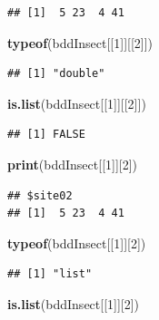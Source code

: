\documentclass[twoside,symmetric]{book}
\newenvironment{Shaded}{}{}
\newcommand{\DecValTok}[1]{#1}
\newcommand{\KeywordTok}[1]{\textbf{#1}}
\newcommand{\NormalTok}[1]{#1}
\begin{document}
\begin{verbatim}
## [1]  5 23  4 41
\end{verbatim}

\begin{Shaded}
\begin{Highlighting}[]
\KeywordTok{typeof}\NormalTok{(bddInsect[[}\DecValTok{1}\NormalTok{]][[}\DecValTok{2}\NormalTok{]])}
\end{Highlighting}
\end{Shaded}

\begin{verbatim}
## [1] "double"
\end{verbatim}

\begin{Shaded}
\begin{Highlighting}[]
\KeywordTok{is.list}\NormalTok{(bddInsect[[}\DecValTok{1}\NormalTok{]][[}\DecValTok{2}\NormalTok{]])}
\end{Highlighting}
\end{Shaded}

\begin{verbatim}
## [1] FALSE
\end{verbatim}

\begin{Shaded}
\begin{Highlighting}[]
\KeywordTok{print}\NormalTok{(bddInsect[[}\DecValTok{1}\NormalTok{]][}\DecValTok{2}\NormalTok{])}
\end{Highlighting}
\end{Shaded}

\begin{verbatim}
## $site02
## [1]  5 23  4 41
\end{verbatim}

\begin{Shaded}
\begin{Highlighting}[]
\KeywordTok{typeof}\NormalTok{(bddInsect[[}\DecValTok{1}\NormalTok{]][}\DecValTok{2}\NormalTok{])}
\end{Highlighting}
\end{Shaded}

\begin{verbatim}
## [1] "list"
\end{verbatim}

\begin{Shaded}
\begin{Highlighting}[]
\KeywordTok{is.list}\NormalTok{(bddInsect[[}\DecValTok{1}\NormalTok{]][}\DecValTok{2}\NormalTok{])}
\end{Highlighting}
\end{Shaded}
\end{document}

